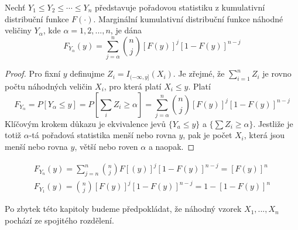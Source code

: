 \begin{theorem}
Nechť $Y_1 \le Y_2 \le \cdots \le Y_n$ představuje pořadovou statistiku z kumulativní distribuční funkce $F(\cdot)$. Marginální kumulativní distribuční funkce náhodné veličiny $Y_{\alpha}$, kde $\alpha = 1, 2, ..., n$, je dána
\begin{equation*}
F_{Y_{\alpha}}(y) = \sum_{j = \alpha}^n \binom{n}{j}[F(y)]^j [1 - F(y)]^{n - j}
\end{equation*}
\end{theorem}

\begin{proof}
Pro fixní $y$ definujme $Z_i = I_{(-\infty, y]}(X_i)$. Je zřejmé, že $\sum_{i = 1}^n Z_i$ je rovno počtu náhodných veličin $X_i$, pro která platí $X_i \le y$. Platí
\begin{equation*}
F_{Y_{\alpha}} = P[Y_{\alpha} \le y] = P\left[\sum_i Z_i \ge \alpha \right] = \sum_{j = \alpha}^n \binom{n}{j}[F(y)]^j [1 - F(y)]^{n - j}
\end{equation*}
Klíčovým krokem důkazu je ekvivalence jevů $\{Y_a \le y\}$ a $\big\{\sum Z_i \ge \alpha \big\}$. Jestliže je totiž $\alpha$-tá pořadová statistika menší nebo rovna $y$, pak je počet $X_i$, která jsou menší nebo rovna $y$, větší nebo roven $\alpha$ a naopak.
\end{proof}

\begin{corollary}
\begin{gather*}
F_{Y_n}(y) = \sum_{j = n}^n \binom{n}{j}F[(y)]^j [1 - F(y)]^{n - j} = [F(y)]^n\\
F_{Y_1}(y) = \binom{n}{j}[F(y)]^j[1 - F(y)]^{n - j} = 1 - [1 - F(y)]^n
\end{gather*}
\end{corollary}

Po zbytek této kapitoly budeme předpokládat, že náhodný vzorek $X_1, ..., X_n$ pochází ze spojitého rozdělení.

